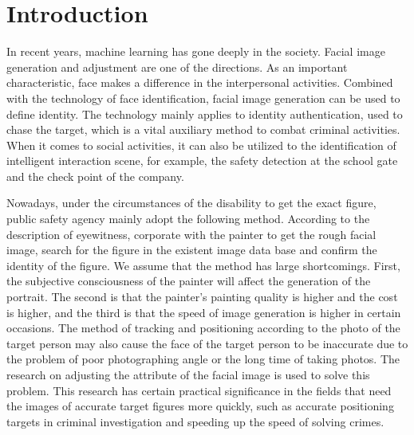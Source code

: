 \section{Introduction}

In recent years, machine learning has gone deeply in the society.
Facial image generation and adjustment are one of the directions.
As an important characteristic, face makes a difference in the interpersonal activities.
Combined with the technology of face identification, facial image generation can be used to define identity.
The technology mainly applies to identity authentication, used to chase the target, which is a vital auxiliary method to combat criminal activities.
When it comes to social activities, it can also be utilized to the identification of intelligent interaction scene, for example, the safety detection at the school gate and the check point of the company.

Nowadays, under the circumstances of the disability to get the exact figure,
    public safety agency mainly adopt the following method.
According to the description of eyewitness, corporate with the painter to get the rough facial image,
    search for the figure in the existent image data base and confirm the identity of the figure.
We assume that the method has large shortcomings.
First, the subjective consciousness of the painter will affect the generation of the portrait.
    The second is that the painter's painting quality is higher and the cost is higher,
    and the third is that the speed of image generation is higher in certain occasions.
The method of tracking and positioning according to the photo of the target person may also cause the face of the target person to be inaccurate due to the problem of poor photographing angle or the long time of taking photos.
The research on adjusting the attribute of the facial image is used to solve this problem.
This research has certain practical significance in the fields that need the images of accurate target figures more quickly,
    such as accurate positioning targets in criminal investigation and speeding up the speed of solving crimes.